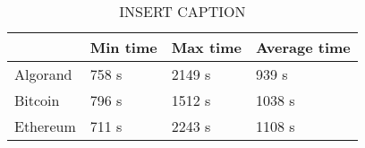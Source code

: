 \begin{center}
\begin{table}[h]
    \centering
    \begin{tabular}{|l|l|l|l|}
        \hline
                  & Min time & Max time & Average time \\ \hline
        Algorand  & 758 s   & 2149 s    & 939  s       \\ \hline
        Bitcoin   & 796 s   & 1512 s    & 1038 s       \\ \hline
        Ethereum  & 711 s   & 2243 s    & 1108 s       \\ \hline
    \end{tabular}
    \caption{INSERT CAPTION}
    \label{tab:gqm}
\end{table}
\end{center}
